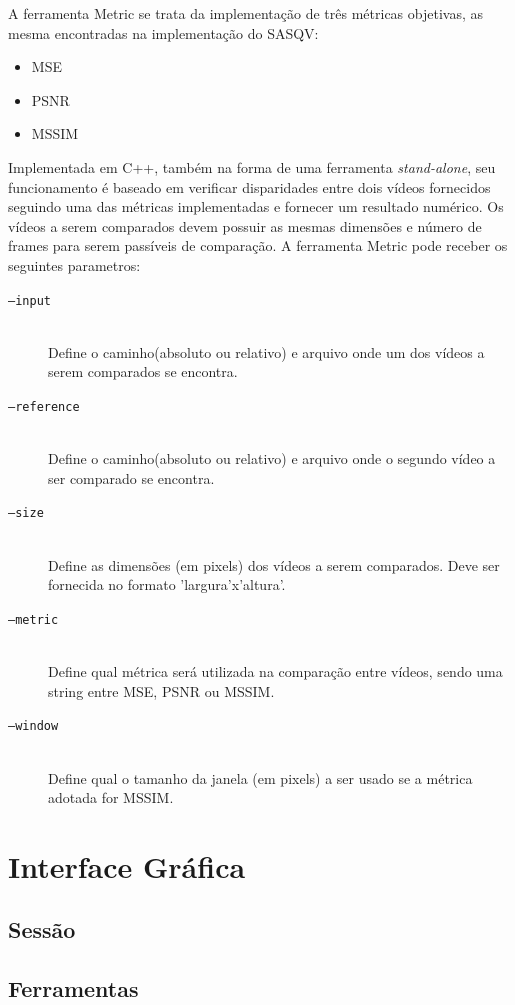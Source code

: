 A ferramenta Metric se trata da implementação de três métricas objetivas, as mesma encontradas na implementação do SASQV:

\begin{itemize}
	\item MSE
	\item PSNR
	\item MSSIM
\end{itemize}

Implementada em C++, também na forma de uma ferramenta \emph{stand-alone}, seu funcionamento é baseado em verificar disparidades entre dois vídeos fornecidos seguindo uma das métricas implementadas e fornecer um resultado numérico. 
Os vídeos a serem comparados devem possuir as mesmas dimensões e número de frames para serem passíveis de comparação. 
A ferramenta Metric pode receber os seguintes parametros:

\begin{description}
	\item[\texttt{--input}] \hfill \\
		Define o caminho(absoluto ou relativo) e arquivo onde um dos vídeos a serem comparados se encontra.
	\item[\texttt{--reference}] \hfill \\
		Define o caminho(absoluto ou relativo) e arquivo onde o segundo vídeo a ser comparado se encontra.
	\item[\texttt{--size}] \hfill \\
		Define as dimensões (em pixels) dos vídeos a serem comparados. Deve ser fornecida no formato 'largura'x'altura'.
	\item[\texttt{--metric}] \hfill \\
		Define qual métrica será utilizada na comparação entre vídeos, sendo uma string entre MSE, PSNR ou MSSIM.
	\item[\texttt{--window}] \hfill \\
		Define qual o tamanho da janela (em pixels) a ser usado se a métrica adotada for MSSIM.
\end{description}

\section{Interface Gráfica}
\subsection{Sessão}
\subsection{Ferramentas}
